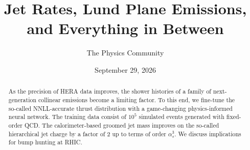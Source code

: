 \documentclass[11pt]{article}
\title{Jet Rates, Lund Plane Emissions, and Everything in Between}
\author{The Physics Community}
\date{September 29, 2026}
\numberwithin{equation}{section}
\theoremstyle{definition}
\theoremstyle{remark}
\begin{document}
\maketitle
\begin{abstract}
As the precision of HERA data improves, the shower histories of a family
of next-generation collinear emissions become a limiting factor. To this
end, we fine-tune the so-called NNLL-accurate thrust distribution with a
game-changing physics-informed neural network. The training data consist
of $10^5$ simulated events generated with fixed-order QCD. The
calorimeter-based groomed jet mass improves on the so-called
hierarchical jet charge by a factor of 2 up to terms of order
$\alpha_s^3$. We discuss implications for bump hunting at RHIC.
\end{abstract}
\tableofcontents





\nocite{*}


\end{document}
